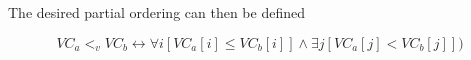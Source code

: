 \documentclass[12pt,a4paper,twoside,openright]{report}
\begin{document}
The desired partial ordering can then be defined

\[VC_a <_v VC_b \leftrightarrow \forall i[VC_a[i] \leq VC_b[i]] \land \exists j[VC_a[j] < VC_b[j]])\]




		
		
		
		
\end{document}
